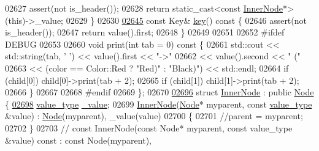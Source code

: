 \begin{DoxyCode}
02627       assert(not is\_header());
02628       \textcolor{keywordflow}{return} \textcolor{keyword}{static\_cast<}\textcolor{keyword}{const }\hyperlink{structaed2_1_1map_1_1InnerNode}{InnerNode}*\textcolor{keyword}{>}(\textcolor{keyword}{this})->\_value;
02629     \}
02630 
\hyperlink{structaed2_1_1map_1_1Node_a08fd071b9bba8048526b8da7e8d73831_a08fd071b9bba8048526b8da7e8d73831}{02645}     \textcolor{keyword}{const} Key& \hyperlink{structaed2_1_1map_1_1Node_a08fd071b9bba8048526b8da7e8d73831_a08fd071b9bba8048526b8da7e8d73831}{key}()\textcolor{keyword}{ const }\{
02646       assert(not is\_header());
02647       \textcolor{keywordflow}{return} value().first;
02648     \}
02649 
02651 
02652 \textcolor{preprocessor}{#ifdef DEBUG}
02653 
02660     \textcolor{keywordtype}{void} print(\textcolor{keywordtype}{int} tab = 0)\textcolor{keyword}{ const }\{
02661       std::cout << std::string(tab, \textcolor{charliteral}{' '}) << value().first << \textcolor{stringliteral}{"->"}
02662                 << value().second << \textcolor{stringliteral}{"   ("}
02663                 << (color == Color::Red ? \textcolor{stringliteral}{"Red)"} : \textcolor{stringliteral}{"Black)"}) << std::endl;
02664       \textcolor{keywordflow}{if} (child[0]) child[0]->print(tab + 2);
02665       \textcolor{keywordflow}{if} (child[1]) child[1]->print(tab + 2);
02666     \}
02667 
02668 \textcolor{preprocessor}{#endif}
02669   \};
02670 
\hyperlink{structaed2_1_1map_1_1InnerNode}{02696}   \textcolor{keyword}{struct }\hyperlink{structaed2_1_1map_1_1InnerNode}{InnerNode} : \textcolor{keyword}{public} \hyperlink{structaed2_1_1map_1_1Node}{Node} \{
\hyperlink{structaed2_1_1map_1_1InnerNode_a53fd8a50986fec67601dd77c44c1657e_a53fd8a50986fec67601dd77c44c1657e}{02698}     \hyperlink{classaed2_1_1map_a719db98e0ff9a837610f76be33264680_a719db98e0ff9a837610f76be33264680}{value\_type} \hyperlink{structaed2_1_1map_1_1InnerNode_a53fd8a50986fec67601dd77c44c1657e_a53fd8a50986fec67601dd77c44c1657e}{\_value};
02699       \hyperlink{structaed2_1_1map_1_1InnerNode}{InnerNode}(\hyperlink{structaed2_1_1map_1_1Node}{Node}* myparent, \textcolor{keyword}{const} \hyperlink{classaed2_1_1map_a719db98e0ff9a837610f76be33264680_a719db98e0ff9a837610f76be33264680}{value\_type} &value) : 
      \hyperlink{structaed2_1_1map_1_1Node}{Node}(myparent), \_value(value)
02700       \{
02701           \textcolor{comment}{//parent = myparent;}
02702       \}
02703     \textcolor{comment}{//  const InnerNode(const Node* myparent, const value\_type &value) const : const Node(myparent),
}
\end{DoxyCode}
